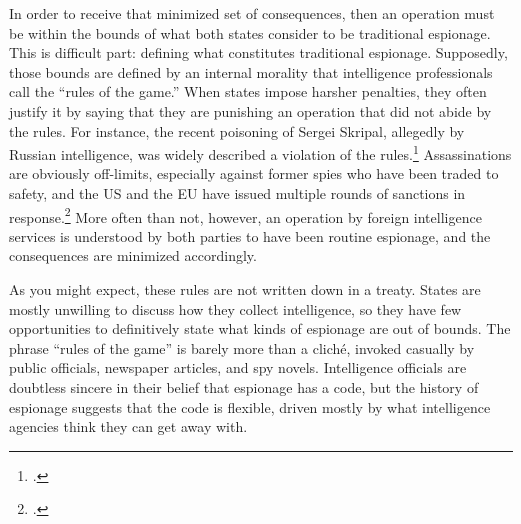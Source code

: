 \documentclass{memoir}
\begin{document}
\begin{refsegment}



In order to receive that minimized set of consequences, then an operation must be within the bounds of what both states consider to be traditional espionage. This is difficult part: defining what constitutes traditional espionage. Supposedly, those bounds are defined by an internal morality that intelligence professionals call the ``rules of the game.'' When states impose harsher penalties, they often justify it by saying that they are punishing an operation that did not abide by the rules. For instance, the recent poisoning of Sergei Skripal, allegedly by Russian intelligence, was widely described a violation of the rules.\footcite{masters_has_2018} Assassinations are obviously off-limits, especially against former spies who have been traded to safety, and the US and the EU have issued multiple rounds of sanctions in response.\footcite{reuters_e.u._2019} More often than not, however, an operation by foreign intelligence services is understood by both parties to have been routine espionage, and the consequences are minimized accordingly.

As you might expect, these rules are not written down in a treaty. States are mostly unwilling to discuss how they collect intelligence, so they have few opportunities to definitively state what kinds of espionage are out of bounds.  The phrase ``rules of the game'' is barely more than a clich\'e, invoked casually by public officials, newspaper articles, and spy novels. Intelligence officials are doubtless sincere in their belief that espionage has a code, but the history of espionage suggests that the code is flexible, driven mostly by what intelligence agencies think they can get away with.


\end{refsegment}
\end{document}
